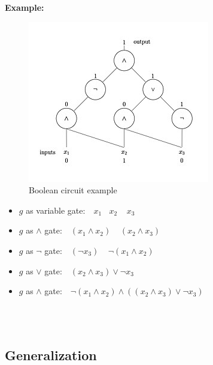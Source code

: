 \documentclass[a4]{scrartcl}
\begin{document}
\textbf{Example:} \\
\begin{minipage}{0.4\textwidth}

\begin{figure}[H]
\begin{center}
\includegraphics[scale=0.6]{booleanC.jpg}
\end{center}
\caption{Boolean circuit example \cite{booleanC}}
\end{figure}

\end{minipage}\begin{minipage}{0.6\textwidth}

\begin{itemize}
\item $g$ as variable gate: $\ \ \ x_1 \ \ \ \  x_2 \ \ \ \ \ x_3$
\item $g$ as $\wedge$ gate: $\ \ \ (x_1 \wedge x_2) \ \ \ \ \ (x_2 \wedge x_3)$
\item $g$ as $\lnot$ gate: $\ \ \ (\lnot x_3) \ \ \ \ \ \lnot (x_1 \wedge x_2)$
\item $g$ as $\vee$ gate: $\ \ \ (x_2 \wedge x_3) \vee \lnot x_3$
\item $g$ as $\wedge$ gate: $\ \ \ \lnot(x_1 \wedge x_2) \wedge ((x_2 \wedge x_3) \vee \lnot x_3)$
\end{itemize}

\end{minipage}












\ \\ \ \\
\subsection*{Generalization}
\end{document}
